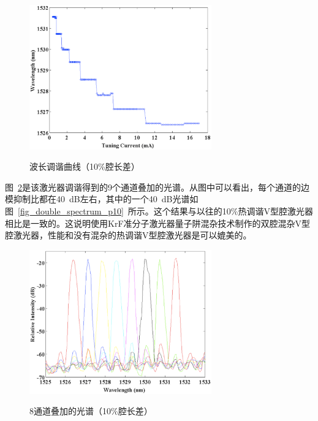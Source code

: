\documentclass{ZJUthesis}
\begin{document}
\begin{figure}[htbp]
  \centering
  \includegraphics[width=0.7\textwidth]{./Pictures/double_tuning_p10.eps}\\
  \caption{波长调谐曲线（10\%腔长差）}
  \label{fig_double_tuning_p10}
\end{figure}

图~\ref{fig_double_spectra_p10}是该激光器调谐得到的9个通道叠加的光谱。从图中可以看出，每个通道的边模抑制比都在40~dB左右，其中的一个40~dB光谱如图~\ref{fig_double_spectrum_p10}~所示。这个结果与以往的10\%热调谐V型腔激光器相比是一致的。这说明使用KrF准分子激光器量子阱混杂技术制作的双腔混杂V型腔激光器，性能和没有混杂的热调谐V型腔激光器是可以媲美的。

\begin{figure}[htbp]
  \centering
  \includegraphics[width=0.7\textwidth]{./Pictures/double_spectra_p10.eps}\\
  \caption{8通道叠加的光谱（10\%腔长差）}
  \label{fig_double_spectra_p10}
\end{figure}
\end{document}
